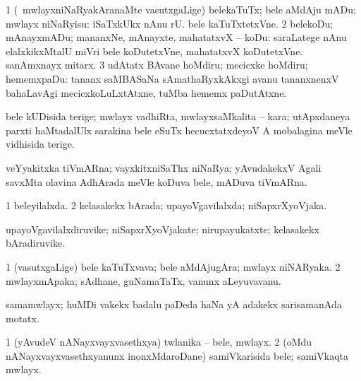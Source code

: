 \bentry 
{} 
\gl{\sakirx}
\bmng
\bnum
\num{1} (\kanmu\ mwlayxniNaRyakAranaMte vasutxgaLige) belekaTuTx; bele aMdAju mADu; mwlayx niNaRyisu:   iSaTxkUkx nAnu  rU. bele kaTuTxtetxVne. 
\num{2} belekoDu; mAnayxmADu; mananxNe, mAnayxte, mahatatxvX -- koDu:  saraLatege nAnu elalxkikxMtalU miVri bele koDutetxVne, mahatatxvX koDutetxVne.  sanAmxnayx mitarx. 
\num{3} udAtatx BAvane hoMdiru; mecicxke hoMdiru; hememxpaDu:  tananx saMBASaNa sAmathaRyxkAkxgi avanu tananxnenxV bahaLavAgi mecicxkoLuLxtAtxne, tuMba hememx paDutAtxne. 
\enum
\emng
\eentry

\bentry
{}
\gl{\nA}
\expl{}
\bmng
 bele kUDisida terige; mwlayx vadhiRta, mwlayxsaMkalita -- kara; utApxdaneya parxti haMtadalUlx sarakina bele eSuTx hecucxtatxdeyoV A mobalagina meVle vidhisida terige. 
\emng
\eentry

\bentry
{}
\gl{\nA}
\expl{}
\bmng
 veYyakitxka tiVmARna; vayxkitxniSaThx niNaRya; yAvudakekxV Agali savxMta olavina AdhArada meVle koDuva bele, mADuva tiVmARna. 
\emng
\eentry

\bentry
{} 
\gl{\gu}
\expl{}
\bmng
\bnum
\num{1} beleyilalxda. 
\num{2} kelasakekx bArada; upayoVgavilalxda; niSapxrXyoVjaka. 
\enum
\emng
\eentry

\bentry
{} 
\gl{\nA}
\expl{}
\bmng
 upayoVgavilalxdiruvike; niSapxrXyoVjakate; nirupayukatxte; kelasakekx bAradiruvike. 
\emng
\eentry

\bentry
{} 
\gl{\nA}
\expl{}
\bmng
\bnum
\num{1} (vasutxgaLige) bele kaTuTxvava; bele aMdAjugAra; mwlayx niNARyaka. 
\num{2} mwlayxmApaka; sAdhane, guNamaTaTx, \mo vanunx aLeyuvavanu. 
\enum
\emng
\eentry

\bentry
{}
\gl{\nA}
\expl{}
\bmng
 samamwlayx; huMDi \mo vakekx badalu paDeda haNa yA adakekx sarisamanAda motatx. 
\emng
\eentry

\bentry
{} 
\gl{\nA}
\expl{}
\bmng
\bnum
\num{1} (yAvudeV nANayxvayxvasethxya) twlanika -- bele, mwlayx. 
\num{2} (oMdu nANayxvayxvasethxyanunx inonxMdaroDane) samiVkarisida bele; samiVkaqta mwlayx. 
\enum
\emng
\eentry

